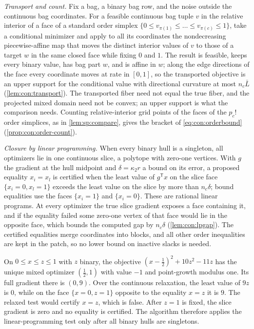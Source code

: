 \emph{Transport and count.} Fix a bag, a binary bag row, and the noise
outside the continuous bag coordinates. For a feasible continuous bag tuple
$v$ in the relative interior of a face of a standard order simplex
$\{0\le v_{\pi(1)}\le\dots\le v_{\pi(c)}\le1\}$, take a conditional minimizer
and apply to all its coordinates the nondecreasing piecewise-affine map that
moves the distinct interior values of $v$ to those of a target $w$ in the
same closed face while fixing $0$ and $1$. The result is feasible, keeps every
binary value, has bag part $w$, and is affine in $w$; along the edge
directions of the face every coordinate moves at rate in $[0,1]$, so the
transported objective is an upper support for the conditional value with
directional curvature at most $n_c\bar L$ (\cref{lem:con:transport}). The
transported fiber need not equal the true fiber, and the projected mixed
domain need not be convex; an upper support is what the comparison needs.
Counting relative-interior grid points of the faces of the $p_c!$ order
simplices, as in \cref{lem:sp:compare}, gives the bracket of
\eqref{eq:con:orderbound} (\cref{prop:con:order-count}).

\emph{Closure by linear programming.} When every binary hull is a singleton,
all optimizers lie in one continuous slice, a polytope with zero-one
vertices. With $g$ the gradient at the hull midpoint and $\delta=\kappa_2r$
a bound on its error, a proposed equality $x_i=x_l$ is certified when the
least value of $g^{\mathsf T}x$ on the slice face $\{x_i=0,x_l=1\}$ exceeds
the least value on the slice by more than $n_c\delta$; bound equalities use the
faces $\{x_i=1\}$ and $\{x_i=0\}$. These are rational linear programs. At
every optimizer the true slice gradient exposes a face containing it, and if
the equality failed some zero-one vertex of that face would lie in the
opposite face, which bounds the computed gap by $n_c\delta$
(\cref{lem:con:lpgap}). The certified equalities merge coordinates into
blocks, and all other order inequalities are kept in the patch, so no lower
bound on inactive slacks is needed.

\begin{example}\label{ex:con:premature}
On $0\le x\le z\le1$ with $z$ binary, the objective
$(x-\frac12)^2+10z^2-11z$ has the unique mixed optimizer $(\frac12,1)$ with
value $-1$ and point-growth modulus one. Its full gradient there is $(0,9)$.
Over the continuous relaxation, the least value of $9z$ is $0$, while on the
face $\{x=0,z=1\}$ opposite to the equality $x=z$ it is $9$. The relaxed test
would certify $x=z$, which is false. After $z=1$ is fixed, the slice gradient
is zero and no equality is certified. The algorithm therefore applies the
linear-programming test only after all binary hulls are singletons.
\end{example}


